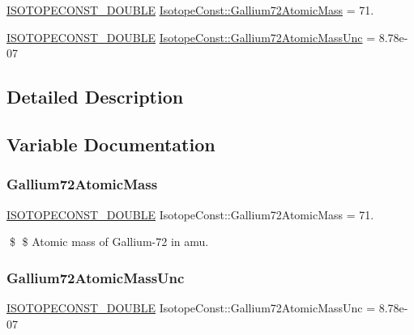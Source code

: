\begin{DoxyCompactItemize}
\item 
\mbox{\hyperlink{group___isotope_const-_macros_ga8f45a7272ce02c0b4c65c44636ed719a}{I\+S\+O\+T\+O\+P\+E\+C\+O\+N\+S\+T\+\_\+\+D\+O\+U\+B\+LE}} \mbox{\hyperlink{group___isotope_const-_gallium-_ga72_ga3ccb9442ea2778335a83d0b70698334d}{Isotope\+Const\+::\+Gallium72\+Atomic\+Mass}} = 71.
\item 
\mbox{\hyperlink{group___isotope_const-_macros_ga8f45a7272ce02c0b4c65c44636ed719a}{I\+S\+O\+T\+O\+P\+E\+C\+O\+N\+S\+T\+\_\+\+D\+O\+U\+B\+LE}} \mbox{\hyperlink{group___isotope_const-_gallium-_ga72_gadb76240677faf86580fd905c17ca9fb8}{Isotope\+Const\+::\+Gallium72\+Atomic\+Mass\+Unc}} = 8.\+78e-\/07
\end{DoxyCompactItemize}


\subsection{Detailed Description}


\subsection{Variable Documentation}
\mbox{\label{group___isotope_const-_gallium-_ga72_ga3ccb9442ea2778335a83d0b70698334d}} 
\subsubsection{\texorpdfstring{Gallium72\+Atomic\+Mass}{Gallium72AtomicMass}}
{\footnotesize\ttfamily \mbox{\hyperlink{group___isotope_const-_macros_ga8f45a7272ce02c0b4c65c44636ed719a}{I\+S\+O\+T\+O\+P\+E\+C\+O\+N\+S\+T\+\_\+\+D\+O\+U\+B\+LE}} Isotope\+Const\+::\+Gallium72\+Atomic\+Mass = 71.}

\$ \$ Atomic mass of Gallium-\/72 in amu. \mbox{\label{group___isotope_const-_gallium-_ga72_gadb76240677faf86580fd905c17ca9fb8}} 
\subsubsection{\texorpdfstring{Gallium72\+Atomic\+Mass\+Unc}{Gallium72AtomicMassUnc}}
{\footnotesize\ttfamily \mbox{\hyperlink{group___isotope_const-_macros_ga8f45a7272ce02c0b4c65c44636ed719a}{I\+S\+O\+T\+O\+P\+E\+C\+O\+N\+S\+T\+\_\+\+D\+O\+U\+B\+LE}} Isotope\+Const\+::\+Gallium72\+Atomic\+Mass\+Unc = 8.\+78e-\/07}

